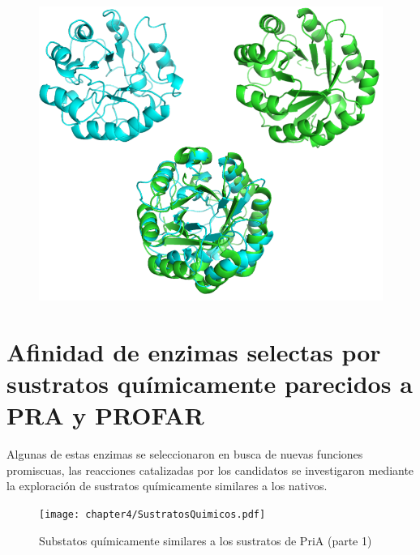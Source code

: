 \documentclass[12pt,twoside]{reedthesis}
\begin{document}
  \begin{figure}[h!tbp]
  \centering
  \includegraphics[angle = 0,scale = .5]{chapter4/Couplings/PriACouplingFoldings.png}
  \caption[Superposición de estructura de PriA generado por Folding con la estructura cristalográfica]{\footnotesize{}}
  \label{fig:CouplingsFoldingPriA}
  \end{figure}
  
  \section{Afinidad de enzimas selectas por sustratos químicamente
  parecidos a PRA y
  PROFAR}\label{afinidad-de-enzimas-selectas-por-sustratos-quimicamente-parecidos-a-pra-y-profar}
  
  Algunas de estas enzimas se seleccionaron en busca de nuevas funciones
  promiscuas, las reacciones catalizadas por los candidatos se
  investigaron mediante la exploración de sustratos químicamente similares
  a los nativos.
  
  \begin{figure}[h!tbp]
  \centering
  \texttt{[image: chapter4/SustratosQuimicos.pdf]}
  \caption[Substatos químicamente similares a los sustratos de PriA (parte 1)]{\footnotesize{Substatos químicamente similares a los sustratos de PriA (parte 1)}}
  \label{fig:Substrates1}
  \end{figure}
  
\end{document}
